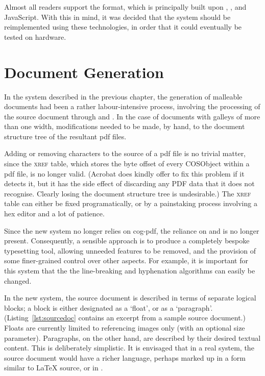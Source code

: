 Almost all \ebook{} readers support the \epub{} format, which is principally built upon \html{}, \css{}, and JavaScript. With this in mind, it was decided that the system should be  reimplemented using these technologies, in order that it could eventually be tested on \ebook{} hardware. 



\section{Document Generation}
\label{sec:docgen}

In the system described in the previous chapter, the generation of malleable documents had been a rather labour-intensive process, involving the processing of the source document through \troff{} and \pdfdit{}. In the case of documents with galleys of more than one width, modifications needed to be made, by hand, to the document structure tree of the resultant \gls{pdf} files.

Adding or removing characters to the source of a \gls{pdf} file is no trivial matter, since the \textsc{xref} table, which stores the byte offset of every \gls{COSObject} within a \gls{pdf} file, is no longer valid. (Acrobat does kindly offer to fix this problem if it detects it, but it has the side effect of discarding any PDF data that it does not recognise. Clearly losing the document structure tree is undesirable.) The \textsc{xref} table can either be fixed programatically, or by a painstaking process involving a hex editor and a lot of  patience. 

Since the new system no longer relies on \gls{cog}-\gls{pdf}, the reliance on \troff{} and \pdfdit{} is no longer present. Consequently, a sensible approach is to produce a completely bespoke typesetting tool, allowing unneeded features to be removed, and the provision of some finer-grained control over other aspects. For example, it is important for this system that the the line-breaking and hyphenation algorithms can easily be changed.

In the new system, the source document is described in terms of separate logical blocks; a block is either designated as a `float', or as a `paragraph'. (Listing~\ref{lst:sourcedoc} contains an excerpt from a sample source document.) Floats are currently limited to referencing images only (with an optional size parameter). Paragraphs, on the other hand, are described by their desired textual content. This is deliberately simplistic. It is envisaged that in a real system, the source document would have a richer language, perhaps marked up in a form similar to \LaTeX{} source, or in \xml{}.

